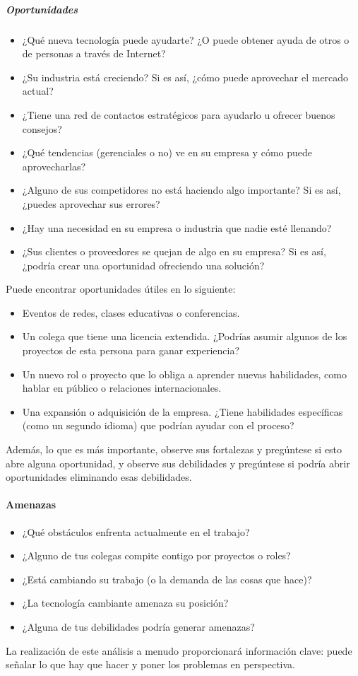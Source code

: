 \documentclass[10pt]{book}
\begin{document}
\subparagraph{Oportunidades}
\begin{itemize}
\item ¿Qué nueva tecnología puede ayudarte? ¿O puede obtener ayuda de otros o de personas a través de Internet? 
\item ¿Su industria está creciendo? Si es así, ¿cómo puede aprovechar el mercado actual?
\item ¿Tiene una red de contactos estratégicos para ayudarlo u ofrecer buenos consejos?
\item ¿Qué tendencias (gerenciales o no) ve en su empresa y cómo puede aprovecharlas?
\item ¿Alguno de sus competidores no está haciendo algo importante? Si es así, ¿puedes aprovechar sus errores?
\item ¿Hay una necesidad en su empresa o industria que nadie esté llenando?
\item ¿Sus clientes o proveedores se quejan de algo en su empresa? Si es así, ¿podría crear una oportunidad ofreciendo una solución?
\end{itemize}
Puede encontrar oportunidades útiles en lo siguiente:
\begin{itemize}
\item Eventos de redes, clases educativas o conferencias.
\item Un colega que tiene una licencia extendida. ¿Podrías asumir algunos de los proyectos de esta persona para ganar experiencia?
\item Un nuevo rol o proyecto que lo obliga a aprender nuevas habilidades, como hablar en público o relaciones internacionales.
\item Una expansión o adquisición de la empresa. ¿Tiene habilidades específicas (como un segundo idioma) que podrían ayudar con el proceso?
\end{itemize}
Además, lo que es más importante, observe sus fortalezas y pregúntese si esto abre alguna oportunidad, y observe sus debilidades y pregúntese si podría abrir oportunidades eliminando esas debilidades.
\paragraph{Amenazas}
\begin{itemize}
\item ¿Qué obstáculos enfrenta actualmente en el trabajo?
\item ¿Alguno de tus colegas compite contigo por proyectos o roles?
\item ¿Está cambiando su trabajo (o la demanda de las cosas que hace)?
\item ¿La tecnología cambiante amenaza su posición?
\item ¿Alguna de tus debilidades podría generar amenazas?
\end{itemize}
La realización de este análisis a menudo proporcionará información clave: puede señalar lo que hay que hacer y poner los problemas en perspectiva.
\end{document}
